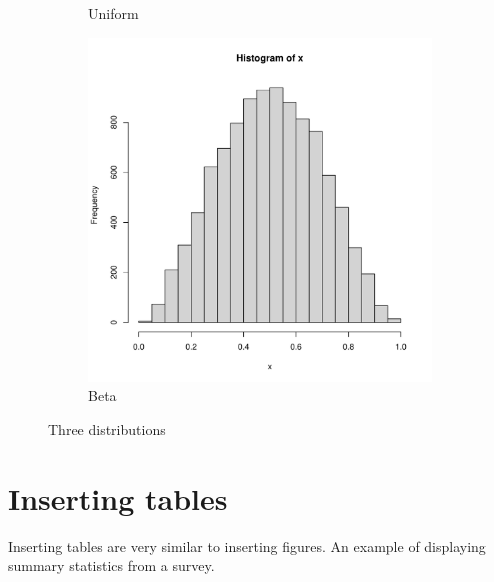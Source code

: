 \documentclass[11pt]{article}
\theoremstyle{quest}
\begin{document}
\begin{figure}
\begin{subfigure}[b]{0.3\textwidth}
         \caption{Uniform}
     \end{subfigure}
     \hfill
     \begin{subfigure}[b]{0.3\textwidth}
         \centering
         \includegraphics[width=\textwidth]{figs/beta.pdf}
         \caption{Beta}
     \end{subfigure}
        \caption{Three distributions}
\end{figure}


\clearpage %
\section{Inserting tables}

Inserting tables are very similar to inserting figures.
An example of displaying summary statistics from a survey.
\end{document}
